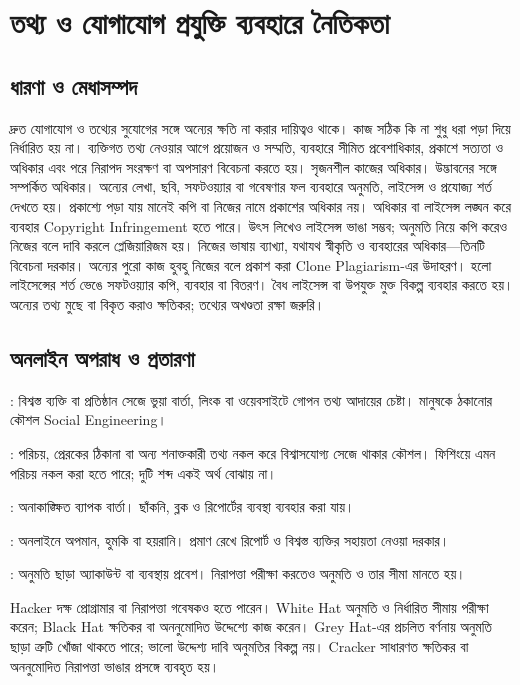 \section{তথ্য ও যোগাযোগ প্রযুক্তি ব্যবহারে নৈতিকতা}
\label{sec:ch1-ethics}
\subsection{ধারণা ও মেধাসম্পদ}
দ্রুত যোগাযোগ ও তথ্যের সুযোগের সঙ্গে অন্যের ক্ষতি না করার দায়িত্বও থাকে। কাজ সঠিক কি না শুধু ধরা পড়া দিয়ে নির্ধারিত হয় না। ব্যক্তিগত তথ্য নেওয়ার আগে প্রয়োজন ও সম্মতি, ব্যবহারে সীমিত প্রবেশাধিকার, প্রকাশে সত্যতা ও অধিকার এবং পরে নিরাপদ সংরক্ষণ বা অপসারণ বিবেচনা করতে হয়।
 সৃজনশীল কাজের অধিকার।  উদ্ভাবনের সঙ্গে সম্পর্কিত অধিকার। অন্যের লেখা, ছবি, সফটওয়্যার বা গবেষণার ফল ব্যবহারে অনুমতি, লাইসেন্স ও প্রযোজ্য শর্ত দেখতে হয়। প্রকাশ্যে পড়া যায় মানেই কপি বা নিজের নামে প্রকাশের অধিকার নয়।
অধিকার বা লাইসেন্স লঙ্ঘন করে ব্যবহার Copyright Infringement হতে পারে। উৎস লিখেও লাইসেন্স ভাঙা সম্ভব; অনুমতি নিয়ে কপি করেও নিজের বলে দাবি করলে প্লেজিয়ারিজম হয়। নিজের ভাষায় ব্যাখ্যা, যথাযথ স্বীকৃতি ও ব্যবহারের অধিকার---তিনটি বিবেচনা দরকার। অন্যের পুরো কাজ হুবহু নিজের বলে প্রকাশ করা Clone Plagiarism-এর উদাহরণ।
 হলো লাইসেন্সের শর্ত ভেঙে সফটওয়্যার কপি, ব্যবহার বা বিতরণ। বৈধ লাইসেন্স বা উপযুক্ত মুক্ত বিকল্প ব্যবহার করতে হয়। অন্যের তথ্য মুছে বা বিকৃত করাও ক্ষতিকর; তথ্যের অখণ্ডতা রক্ষা জরুরি।
\subsection{অনলাইন অপরাধ ও প্রতারণা}
\begin{compactpoints}
\item {}: বিশ্বস্ত ব্যক্তি বা প্রতিষ্ঠান সেজে ভুয়া বার্তা, লিংক বা ওয়েবসাইটে গোপন তথ্য আদায়ের চেষ্টা। মানুষকে ঠকানোর কৌশল Social Engineering।
\item {}: পরিচয়, প্রেরকের ঠিকানা বা অন্য শনাক্তকারী তথ্য নকল করে বিশ্বাসযোগ্য সেজে থাকার কৌশল। ফিশিংয়ে এমন পরিচয় নকল করা হতে পারে; দুটি শব্দ একই অর্থ বোঝায় না।
\item {}: অনাকাঙ্ক্ষিত ব্যাপক বার্তা। ছাঁকনি, ব্লক ও রিপোর্টের ব্যবস্থা ব্যবহার করা যায়।
\item {}: অনলাইনে অপমান, হুমকি বা হয়রানি। প্রমাণ রেখে রিপোর্ট ও বিশ্বস্ত ব্যক্তির সহায়তা নেওয়া দরকার।
\item {}: অনুমতি ছাড়া অ্যাকাউন্ট বা ব্যবস্থায় প্রবেশ। নিরাপত্তা পরীক্ষা করতেও অনুমতি ও তার সীমা মানতে হয়।
\end{compactpoints}
Hacker দক্ষ প্রোগ্রামার বা নিরাপত্তা গবেষকও হতে পারেন। White Hat অনুমতি ও নির্ধারিত সীমায় পরীক্ষা করেন; Black Hat ক্ষতিকর বা অননুমোদিত উদ্দেশ্যে কাজ করেন। Grey Hat-এর প্রচলিত বর্ণনায় অনুমতি ছাড়া ত্রুটি খোঁজা থাকতে পারে; ভালো উদ্দেশ্য দাবি অনুমতির বিকল্প নয়। Cracker সাধারণত ক্ষতিকর বা অননুমোদিত নিরাপত্তা ভাঙার প্রসঙ্গে ব্যবহৃত হয়।

